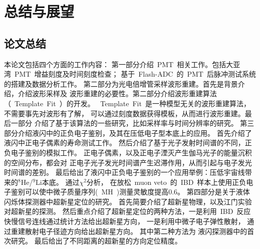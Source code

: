 
\chapter{总结与展望}
\label{chap:chap7}
\section{论文总结}

本论文包括四个方面的工作内容：
第一部分介绍~PMT~相关工作。包括大亚湾~PMT~增益刻度及时间刻度检查；
基于~Flash-ADC~的~PMT~后脉冲测试系统的搭建及数据分析工作。
第二部分为光电倍增管采样波形重建。首先是背景介绍，介绍波形采样及
波形重建的必要性。第二部分介绍波形重建算法（~Template~Fit~）的开发。
~Template~Fit~是一种模型无关的波形重建算法，不需要事先对波形有了解，
可以通过刻度数据获得模板，从而进行波形重建。最后一部分
介绍了基于该算法的一些研究，比如采样率与时间分辨率的研究。
第三部分介绍液闪中的正负电子鉴别，及其在压低电子型本底上的应用。
首先介绍了液闪中正电子偶素的寿命测试工作。
然后介绍了基于光子发射时间谱的不同，正负电子鉴别的模拟工作。
正电子偶素，以及正电子湮灭产生伽马光子的能量沉积的空间分布，都会对
正电子光子发光时间谱产生迟滞作用，从而引起与电子发光时间谱的差别。
最后给出了液闪中正负电子鉴别的一个应用举例：压低宇宙线带来的$^8$He/$^9$Li本底。
通过$\chi^2$分析，
在放松~muon veto~的~IBD~样本上使用正负电子鉴别可以使中微子质量序列(~MH~)测量灵敏度提高0.6。
第四部分是关于液体闪烁体探测器中超新星定位的研究。
首先简要介绍了超新星物理，以及江门实验对超新星的探测。
然后重点介绍了超新星定位的两种方法，一是利用~IBD~反应
快慢信号连线通过统计方法给出超新星方向，
一是利用中微子电子弹性散射，
通过重建散射电子径迹方向给出超新星方向。
其中第二种方法为
液闪探测器中的首次研究。
最后给出了不同距离的超新星的方向定位精度。

